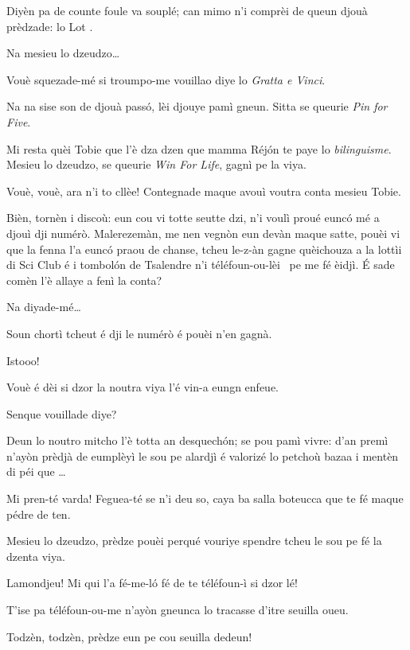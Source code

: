 \begin{drama}
\DzeudzoSenliquerspeaks Diyèn pa de counte foule va souplé; can mimo n’i comprèi de queun djouà prèdzade: lo Lot \lotto.

\Tobiespeaks Na mesieu lo dzeudzo\ldots

\DzeudzoSenliquerspeaks Vouè squezade-mé si troumpo-me vouillao diye lo \textit{Gratta e Vinci}.

\Tobiespeaks Na na sise son de djouà passó, lèi djouye pamì gneun. Sitta se queurie \textit{Pin for Five}.

\Bertinaspeaks Mi resta quèi Tobie que l’è dza dzen que mamma Réjón te paye lo \textit{bilinguisme}.  Mesieu lo dzeudzo, se queurie \textit{Win For Life}, gagnì pe la viya.

\DzeudzoSenliquerspeaks Vouè, vouè, ara n’i to cllèe! Contegnade maque avouì voutra conta mesieu Tobie.

\Tobiespeaks Bièn, tornèn i discoù: eun cou vi totte seutte dzi, n’i voulì proué eunc\'o mé a djouì  dji numérò. Malerezemàn, me nen vegnòn eun devàn maque satte, pouèi vi que la fenna l'a eunc\'o praou de chanse, tcheu le-z-àn gagne quèichouza a la lottìi di Sci Club é i tombol\'on de Tsalendre n’i téléfoun-ou-lèi \chiamare\ pe me fé èidjì. É sade comèn l’è allaye a fenì la conta?

\DzeudzoSenliquerspeaks Na diyade-mé\ldots

\Tobiespeaks Soun chortì tcheut é dji le numérò é pouèi n’en gagnà.

\DzeudzoSenliquerspeaks Istooo!

\Bertinaspeaks Vouè é dèi si dzor la noutra viya l’é vin-a eungn enfeue.

\DzeudzoSenliquerspeaks Senque vouillade diye?

\Bertinaspeaks Deun lo noutro mitcho l’è totta an desquechón; se pou pamì vivre: d'an premì n’ayòn prèdjà de eumplèyì le sou pe alardjì é valorizé lo petchoù bazaa i mentèn di péi que \ldots

\Tobiespeaks Mi pren-té varda! Feguea-té se n’i deu so, caya ba salla boteucca que te fé maque pédre de ten.

\Bertinaspeaks Mesieu lo dzeudzo, prèdze pouèi perqué vouriye spen\-dre tcheu le sou pe fé la dzenta viya.

\Tobiespeaks Lamondjeu! Mi qui l'a fé-me-l\'o fé de te téléfoun-ì si dzor lé!

\Bertinaspeaks T'ise pa téléfoun-ou-me n’ayòn gneunca lo tracasse d’itre seuilla oueu.

\DzeudzoSenliquerspeaks {} Todzèn, todzèn, prèdze eun pe cou seuilla dedeun!


\end{drama}
